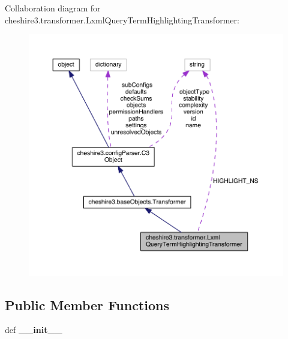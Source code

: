 Collaboration diagram for cheshire3.\-transformer.\-Lxml\-Query\-Term\-Highlighting\-Transformer\-:
\nopagebreak
\begin{figure}[H]
\begin{center}
\leavevmode
\includegraphics[width=350pt]{classcheshire3_1_1transformer_1_1_lxml_query_term_highlighting_transformer__coll__graph}
\end{center}
\end{figure}
\subsection*{Public Member Functions}
\begin{DoxyCompactItemize}
\item 
\hypertarget{classcheshire3_1_1transformer_1_1_lxml_query_term_highlighting_transformer_a5ccbbedd40b77c2605618daf499ba127}{def {\bfseries \-\_\-\-\_\-init\-\_\-\-\_\-}}\label{classcheshire3_1_1transformer_1_1_lxml_query_term_highlighting_transformer_a5ccbbedd40b77c2605618daf499ba127}

\end{DoxyCompactItemize}
